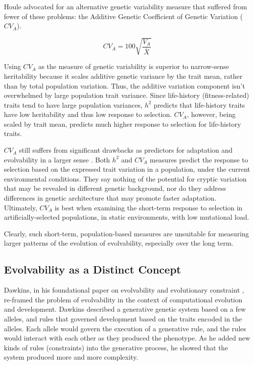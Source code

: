 \documentclass[PhD]{msu-thesis}
\begin{document}
Houle advocated for an alternative genetic variability measure that suffered from fewer of these problems: the Additive Genetic Coefficient of Genetic Variation ($CV_A$).

\begin{equation}
CV_A = 100\sqrt{\frac{V_A}{\bar X}}
\end{equation}

Using $CV_A$ as the measure of genetic variability is superior to narrow-sense heritability because it scales additive genetic variance by the trait mean, rather than by total population variation. Thus, the additive variation component isn’t overwhelmed by large population trait variance\cite{hansen_measuring_2008}. Since life-history (fitness-related) traits tend to have large population variances, $h^2$ predicts that life-history traits have low heritability and thus low response to selection\cite{price_low_1991}. $CV_A$, however, being scaled by trait mean, predicts much higher response to selection for life-history traits\cite{hansen_heritability_2011,houle_comparing_1992}.

$CV_A$ still suffers from significant drawbacks as predictors for adaptation and evolvability in a larger sense \cite{hansen_heritability_2011}. Both $h^2$ and $CV_A$ measures predict the response to selection based on the expressed trait variation in a population, under the current environmental conditions. They say nothing of the potential for cryptic variation that may be revealed in different genetic background, nor do they address differences in genetic architecture that may promote faster adaptation. Ultimately, $CV_A$ is best when examining the short-term response to selection in artificially-selected populations, in static environments, with low mutational load\cite{houle_comparing_1992}.

Clearly, such short-term, population-based measures are unsuitable for measuring larger patterns of the evolution of evolvability, especially over the long term.

\subsection{Evolvability as a Distinct Concept}
Dawkins, in his foundational paper on evolvability and evolutionary constraint \cite{dawkins_13_2003}, re-framed the problem of evolvability in the context of computational evolution and development. Dawkins described a generative genetic system based on a few alleles, and rules that governed development based on the traits encoded in the alleles. Each allele would govern the execution of a generative rule, and the rules would interact with each other as they produced the phenotype. As he added new kinds of rules (constraints) into the generative process, he showed that the system produced more and more complexity.
\end{document}
